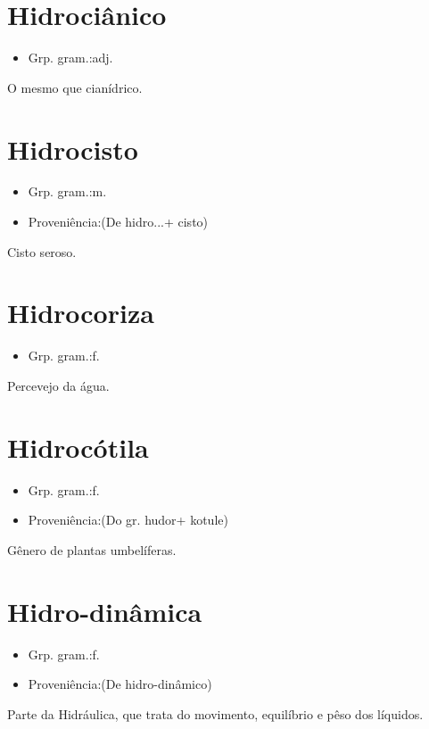 \documentclass{article}
\begin{document}
\section{Hidrociânico}
\begin{itemize}
\item {Grp. gram.:adj.}
\end{itemize}
O mesmo que \textunderscore cianídrico\textunderscore .
\section{Hidrocisto}
\begin{itemize}
\item {Grp. gram.:m.}
\end{itemize}
\begin{itemize}
\item {Proveniência:(De \textunderscore hidro...\textunderscore  + \textunderscore cisto\textunderscore )}
\end{itemize}
Cisto seroso.
\section{Hidrocoriza}
\begin{itemize}
\item {Grp. gram.:f.}
\end{itemize}
Percevejo da água.
\section{Hidrocótila}
\begin{itemize}
\item {Grp. gram.:f.}
\end{itemize}
\begin{itemize}
\item {Proveniência:(Do gr. \textunderscore hudor\textunderscore  + \textunderscore kotule\textunderscore )}
\end{itemize}
Gênero de plantas umbelíferas.
\section{Hidro-dinâmica}
\begin{itemize}
\item {Grp. gram.:f.}
\end{itemize}
\begin{itemize}
\item {Proveniência:(De \textunderscore hidro-dinâmico\textunderscore )}
\end{itemize}
Parte da Hidráulica, que trata do movimento, equilíbrio e pêso dos líquidos.
\end{document}
